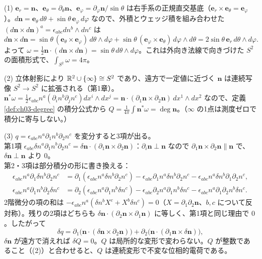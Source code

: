\begin{solution}
(1) $\bm e_r=\bm n$、$\bm e_\theta=\partial_\theta\bm n$、$\bm e_\varphi=\partial_\varphi\bm n/\sin\theta$ は右手系の正規直交基底（$\bm e_r\times\bm e_\theta=\bm e_\varphi$）。$d\bm n=\bm e_\theta\,d\theta+\sin\theta\,\bm e_\varphi\,d\varphi$ なので、外積とウェッジ積を組み合わせた $(d\bm n\times d\bm n)^a=\epsilon_{abc}dn^b\wedge dn^c$ は
\[
d\bm n\times d\bm n=\sin\theta\,(\bm e_\theta\times\bm e_\varphi)\,d\theta\wedge d\varphi+\sin\theta\,(\bm e_\varphi\times\bm e_\theta)\,d\varphi\wedge d\theta=2\sin\theta\,\bm e_r\,d\theta\wedge d\varphi .
\]
よって $\omega=\frac12\bm n\cdot(d\bm n\times d\bm n)=\sin\theta\,d\theta\wedge d\varphi$。これは外向き法線で向きづけた $S^2$ の面積形式で、$\int_{S^2}\omega=4\pi$。

(2) 立体射影により $\mathbb{R}^2\cup\{\infty\}\cong S^2$ であり、遠方で一定値に近づく $\bm n$ は連続写像 $S^2\to S^2$ に拡張される（第1章）。$\bm n^*\omega=\frac12\epsilon_{abc}n^a(\partial_in^b\partial_jn^c)dx^i\wedge dx^j=\bm n\cdot(\partial_1\bm n\times\partial_2\bm n)\,dx^1\wedge dx^2$ なので、定義 \ref{def:ch03-degree} の積分公式から $Q=\frac{1}{4\pi}\int\bm n^*\omega=\deg\bm n$。（$\infty$ の1点は測度ゼロで積分に寄与しない。）

(3) $q=\epsilon_{abc}n^a\partial_1n^b\partial_2n^c$ を変分すると3項が出る。\\
第1項 $\epsilon_{abc}\delta n^a\partial_1n^b\partial_2n^c=\delta\bm n\cdot(\partial_1\bm n\times\partial_2\bm n)$：$\partial_i\bm n\perp\bm n$ なので $\partial_1\bm n\times\partial_2\bm n\parallel\bm n$ で、$\delta\bm n\perp\bm n$ より $0$。\\
第2・3項は部分積分の形に書き換える：
\begin{align*}
\epsilon_{abc}n^a\partial_1\delta n^b\partial_2n^c&=\partial_1(\epsilon_{abc}n^a\delta n^b\partial_2n^c)-\epsilon_{abc}\partial_1n^a\delta n^b\partial_2n^c-\epsilon_{abc}n^a\delta n^b\partial_1\partial_2n^c,\\
\epsilon_{abc}n^a\partial_1n^b\partial_2\delta n^c&=\partial_2(\epsilon_{abc}n^a\partial_1n^b\delta n^c)-\epsilon_{abc}\partial_2n^a\partial_1n^b\delta n^c-\epsilon_{abc}n^a\partial_1\partial_2n^b\delta n^c .
\end{align*}
2階微分の項の和は $-\epsilon_{abc}n^a(\delta n^bX^c+X^b\delta n^c)=0$（$X=\partial_1\partial_2\bm n$、$b,c$ について反対称）。残りの2項はどちらも $\delta\bm n\cdot(\partial_2\bm n\times\partial_1\bm n)$ に等しく、第1項と同じ理由で $0$。したがって
\[
\delta q=\partial_1\bigl(\bm n\cdot(\delta\bm n\times\partial_2\bm n)\bigr)+\partial_2\bigl(\bm n\cdot(\partial_1\bm n\times\delta\bm n)\bigr),
\]
$\delta\bm n$ が遠方で消えれば $\delta Q=0$。$Q$ は局所的な変形で変わらない。$Q$ が整数であること（(2)）と合わせると、$Q$ は連続変形で不変な位相的電荷である。
\end{solution}

